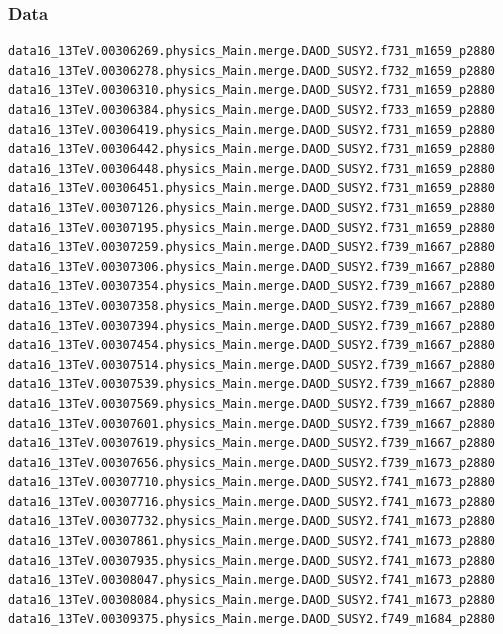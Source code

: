 \documentclass[mathserif,serif]{beamer}
\begin{document}
\begin{frame}[fragile]
\frametitle{Data}
\tiny
\begin{verbatim}
data16_13TeV.00306269.physics_Main.merge.DAOD_SUSY2.f731_m1659_p2880
data16_13TeV.00306278.physics_Main.merge.DAOD_SUSY2.f732_m1659_p2880
data16_13TeV.00306310.physics_Main.merge.DAOD_SUSY2.f731_m1659_p2880
data16_13TeV.00306384.physics_Main.merge.DAOD_SUSY2.f733_m1659_p2880
data16_13TeV.00306419.physics_Main.merge.DAOD_SUSY2.f731_m1659_p2880
data16_13TeV.00306442.physics_Main.merge.DAOD_SUSY2.f731_m1659_p2880
data16_13TeV.00306448.physics_Main.merge.DAOD_SUSY2.f731_m1659_p2880
data16_13TeV.00306451.physics_Main.merge.DAOD_SUSY2.f731_m1659_p2880
data16_13TeV.00307126.physics_Main.merge.DAOD_SUSY2.f731_m1659_p2880
data16_13TeV.00307195.physics_Main.merge.DAOD_SUSY2.f731_m1659_p2880
data16_13TeV.00307259.physics_Main.merge.DAOD_SUSY2.f739_m1667_p2880
data16_13TeV.00307306.physics_Main.merge.DAOD_SUSY2.f739_m1667_p2880
data16_13TeV.00307354.physics_Main.merge.DAOD_SUSY2.f739_m1667_p2880
data16_13TeV.00307358.physics_Main.merge.DAOD_SUSY2.f739_m1667_p2880
data16_13TeV.00307394.physics_Main.merge.DAOD_SUSY2.f739_m1667_p2880
data16_13TeV.00307454.physics_Main.merge.DAOD_SUSY2.f739_m1667_p2880
data16_13TeV.00307514.physics_Main.merge.DAOD_SUSY2.f739_m1667_p2880
data16_13TeV.00307539.physics_Main.merge.DAOD_SUSY2.f739_m1667_p2880
data16_13TeV.00307569.physics_Main.merge.DAOD_SUSY2.f739_m1667_p2880
data16_13TeV.00307601.physics_Main.merge.DAOD_SUSY2.f739_m1667_p2880
data16_13TeV.00307619.physics_Main.merge.DAOD_SUSY2.f739_m1667_p2880
data16_13TeV.00307656.physics_Main.merge.DAOD_SUSY2.f739_m1673_p2880
data16_13TeV.00307710.physics_Main.merge.DAOD_SUSY2.f741_m1673_p2880
data16_13TeV.00307716.physics_Main.merge.DAOD_SUSY2.f741_m1673_p2880
data16_13TeV.00307732.physics_Main.merge.DAOD_SUSY2.f741_m1673_p2880
data16_13TeV.00307861.physics_Main.merge.DAOD_SUSY2.f741_m1673_p2880
data16_13TeV.00307935.physics_Main.merge.DAOD_SUSY2.f741_m1673_p2880
data16_13TeV.00308047.physics_Main.merge.DAOD_SUSY2.f741_m1673_p2880
data16_13TeV.00308084.physics_Main.merge.DAOD_SUSY2.f741_m1673_p2880
data16_13TeV.00309375.physics_Main.merge.DAOD_SUSY2.f749_m1684_p2880
\end{verbatim}
\end{frame}
\end{document}
